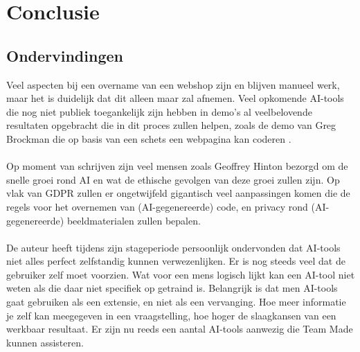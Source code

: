 
\chapter{Conclusie}%
\label{ch:conclusie}

\section{Ondervindingen}
Veel aspecten bij een overname van een webshop zijn en blijven manueel werk, maar het is duidelijk dat dit alleen maar zal afnemen. Veel opkomende AI-tools die nog niet publiek toegankelijk zijn hebben in demo's al veelbelovende resultaten opgebracht die in dit proces zullen helpen, zoals de demo van Greg Brockman die op basis van een schets een webpagina kan coderen \autocite{Das2023}.
\\\\
Op moment van schrijven zijn veel mensen zoals Geoffrey Hinton \autocite{ZoeKleinman2023} bezorgd om de snelle groei rond AI en wat de ethische gevolgen van deze groei zullen zijn. Op vlak van GDPR zullen er ongetwijfeld gigantisch veel aanpassingen komen die de regels voor het overnemen van (AI-gegenereerde) code, en privacy rond (AI-gegenereerde) beeldmaterialen zullen bepalen.
\\\\
De auteur heeft tijdens zijn stageperiode persoonlijk ondervonden dat AI-tools niet alles perfect zelfstandig kunnen verwezenlijken. Er is nog steeds veel dat de gebruiker zelf moet voorzien. Wat voor een mens logisch lijkt kan een AI-tool niet weten als die daar niet specifiek op getraind is. Belangrijk is dat men AI-tools gaat gebruiken als een extensie, en niet als een vervanging. Hoe meer informatie je zelf kan meegegeven in een vraagstelling, hoe hoger de slaagkansen van een werkbaar resultaat. Er zijn nu reeds een aantal AI-tools aanwezig die Team Made kunnen assisteren. 
\\\\
